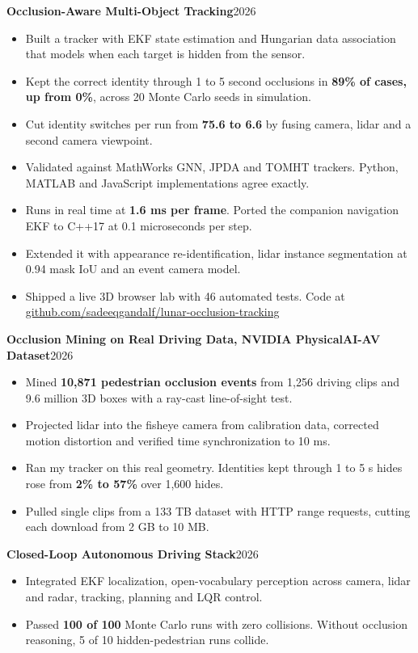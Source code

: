 \documentclass[10pt,letterpaper]{article}
\newcommand{\project}[2]{\vspace{2.8pt}\textbf{#1}\hfill #2\par\vspace{1pt}}
\newcommand{\key}[1]{\textbf{#1}}          %
\newcommand{\AV}{\mbox{A}\mbox{V}}
\begin{document}
\project{Occlusion-Aware Multi-Object Tracking}{2026}
\begin{itemize}
  \item Built a tracker with EKF state estimation and Hungarian data association that models when each target is hidden from the sensor.
  \item Kept the correct identity through 1 to 5 second occlusions in \key{89\% of cases, up from 0\%}, across 20 Monte Carlo seeds in simulation.
  \item Cut identity switches per run from \key{75.6 to 6.6} by fusing camera, lidar and a second camera viewpoint.
  \item Validated against MathWorks GNN, JPDA and TOMHT trackers. Python, MATLAB and JavaScript implementations agree exactly.
  \item Runs in real time at \key{1.6 ms per frame}. Ported the companion navigation EKF to C++17 at 0.1 microseconds per step.
  \item Extended it with appearance re-identification, lidar instance segmentation at 0.94 mask IoU and an event camera model.
  \item Shipped a live 3D browser lab with 46 automated tests. Code at \href{https://github.com/sadeeqgandalf/lunar-occlusion-tracking}{github.com/sadeeqgandalf/lunar-occlusion-tracking}
\end{itemize}

\project{Occlusion Mining on Real Driving Data, NVIDIA PhysicalAI-\AV{} Dataset}{2026}
\begin{itemize}
  \item Mined \key{10,871 pedestrian occlusion events} from 1,256 driving clips and 9.6 million 3D boxes with a ray-cast line-of-sight test.
  \item Projected lidar into the fisheye camera from calibration data, corrected motion distortion and verified time synchronization to 10 ms.
  \item Ran my tracker on this real geometry. Identities kept through 1 to 5 s hides rose from \key{2\% to 57\%} over 1,600 hides.
  \item Pulled single clips from a 133 TB dataset with HTTP range requests, cutting each download from 2 GB to 10 MB.
\end{itemize}

\project{Closed-Loop Autonomous Driving Stack}{2026}
\begin{itemize}
  \item Integrated EKF localization, open-vocabulary perception across camera, lidar and radar, tracking, planning and LQR control.
  \item Passed \key{100 of 100} Monte Carlo runs with zero collisions. Without occlusion reasoning, 5 of 10 hidden-pedestrian runs collide.
\end{itemize}
\end{document}
